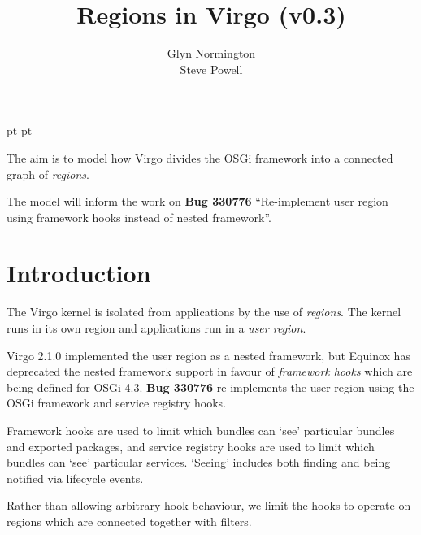 \documentclass[a4paper,9pt]{article}
\begin{document}
 pt
 pt

\title{Regions in Virgo (v0.3)}
\author{Glyn Normington\\Steve Powell}

\maketitle
\thispagestyle{myheadings}
\setcounter{page}{0}

The aim is to model how Virgo divides the OSGi framework into a connected graph
of \textit{regions}.

The model will inform the work on \textbf{Bug 330776} ``Re-implement user region using
framework hooks instead of nested framework''.


\newcommand{\true}{true}
\newcommand{\false}{false}
\renewcommand{\emptyset}{\varnothing}
\newcommand{\ModuleDefZero}{ModuleDef_0}
\newcommand{\ModuleDefOne}{ModuleDef_1}
\newcommand{\ModuleDefTwo}{ModuleDef_2}
\newcommand{\ModuleDefThree}{ModuleDef_3}
\newcommand{\ModuleDefFour}{ModuleDef_4}

\clearpage
{}
\section{Introduction}
\label{cha:intro}

The Virgo kernel is isolated from applications by the use of \textit{regions}.
The kernel runs in its own region and applications run in a \textit{user region}.

Virgo 2.1.0 implemented the user region as a nested framework, but Equinox
has deprecated the nested framework support in favour of \textit{framework hooks}
which are being defined for OSGi 4.3.
\textbf{Bug 330776} re-implements the user region using the OSGi framework and service
registry hooks.

Framework hooks are used to limit which bundles can `see' particular bundles
and exported packages, and service registry hooks are used to limit which bundles
can `see' particular services. `Seeing' includes both finding and being notified via lifecycle events.

Rather than allowing arbitrary hook behaviour, we limit the hooks to operate on regions
which are connected together with filters.
\end{document}
